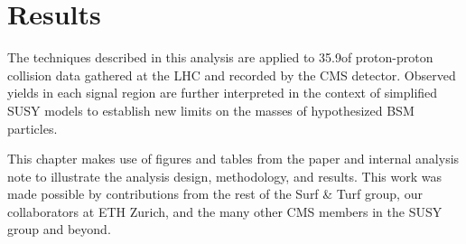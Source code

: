 \chapter{Results}
\label{ch:results}
The techniques described in this analysis are applied to 35.9\fbinv of proton-proton collision data gathered at the LHC and recorded by the CMS detector. Observed yields in each signal region are further interpreted in the context of simplified SUSY models to establish new limits on the masses of hypothesized BSM particles.




This chapter makes use of figures and tables from the \mttwo paper and internal analysis note to illustrate the analysis design, methodology, and results. This work was made possible by contributions from the rest of the Surf \& Turf group, our collaborators at ETH Zurich, and the many other CMS members in the SUSY group and beyond.


